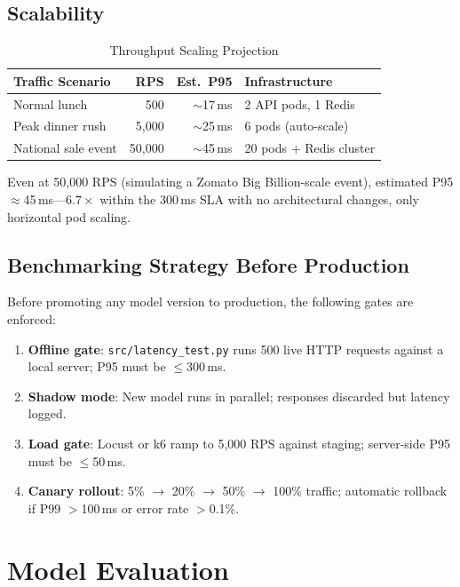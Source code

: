 \documentclass[conference]{IEEEtran}
\begin{document}
\subsection{Scalability}

\begin{table}[h]
\caption{Throughput Scaling Projection}
\centering
\begin{tabular}{lrrl}
\toprule
Traffic Scenario & RPS & Est.\ P95 & Infrastructure \\
\midrule
Normal lunch        &    500 & $\sim$17\,ms & 2 API pods, 1 Redis \\
Peak dinner rush    &  5,000 & $\sim$25\,ms & 6 pods (auto-scale) \\
National sale event & 50,000 & $\sim$45\,ms & 20 pods + Redis cluster \\
\bottomrule
\end{tabular}
\end{table}

Even at 50,000 RPS (simulating a Zomato Big Billion-scale event), estimated
P95 $\approx$45\,ms---$6.7\times$ within the 300\,ms SLA with no
architectural changes, only horizontal pod scaling.

\subsection{Benchmarking Strategy Before Production}

Before promoting any model version to production, the following gates are
enforced:
\begin{enumerate}
  \item \textbf{Offline gate}: \texttt{src/latency\_test.py} runs 500 live
        HTTP requests against a local server; P95 must be $\leq$300\,ms.
  \item \textbf{Shadow mode}: New model runs in parallel; responses discarded
        but latency logged.
  \item \textbf{Load gate}: Locust or k6 ramp to 5,000 RPS against staging;
        server-side P95 must be $\leq$50\,ms.
  \item \textbf{Canary rollout}: 5\% $\to$ 20\% $\to$ 50\% $\to$ 100\%
        traffic; automatic rollback if P99 $>$100\,ms or error rate $>$0.1\%.
\end{enumerate}


\section{Model Evaluation}
\end{document}
